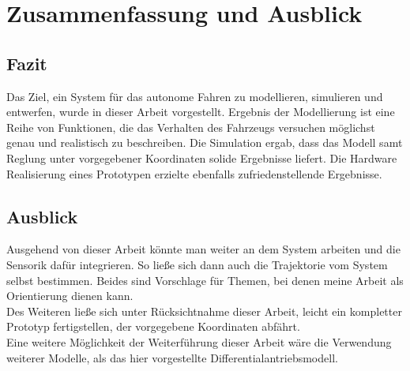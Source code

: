 \chapter{Zusammenfassung und Ausblick}

\section{Fazit}
\label{sec:Fazit}
Das Ziel, ein System für das autonome Fahren zu modellieren, simulieren und entwerfen, wurde in dieser Arbeit vorgestellt. Ergebnis der Modellierung ist eine Reihe von Funktionen, die das Verhalten des Fahrzeugs versuchen möglichst genau und realistisch zu beschreiben. Die Simulation ergab, dass das Modell samt Reglung unter vorgegebener Koordinaten solide Ergebnisse liefert. Die Hardware Realisierung eines Prototypen erzielte ebenfalls zufriedenstellende Ergebnisse. \\


\section{Ausblick}
\label{sec:ausblick}
Ausgehend von dieser Arbeit könnte man weiter an dem System arbeiten und die Sensorik dafür integrieren. So ließe sich dann auch die Trajektorie vom System selbst bestimmen. Beides sind Vorschlage für Themen, bei denen meine Arbeit als Orientierung dienen kann. \\
Des Weiteren ließe sich unter Rücksichtnahme dieser Arbeit, leicht ein kompletter Prototyp fertigstellen, der vorgegebene Koordinaten abfährt. \\
Eine weitere Möglichkeit der Weiterführung dieser Arbeit wäre die Verwendung weiterer Modelle, als das hier vorgestellte Differentialantriebsmodell.